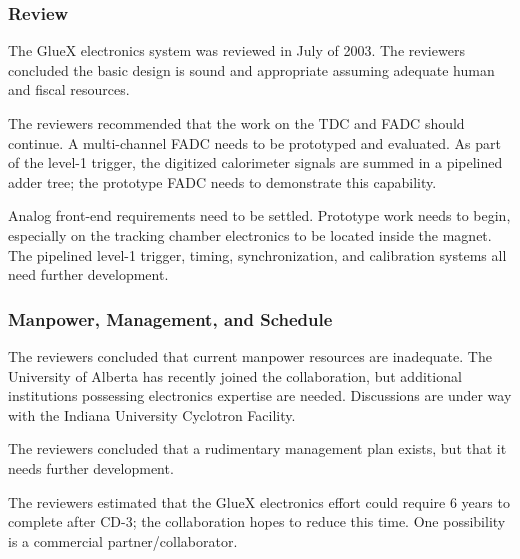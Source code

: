 \subsubsection*{Review}

The GlueX electronics system was reviewed in July of 2003.  The
reviewers concluded the basic design is sound and appropriate assuming
adequate human and fiscal resources.

The reviewers recommended that the work on the TDC and FADC should
continue.  A multi-channel FADC needs to be prototyped and evaluated.
As part of the level-1 trigger, the digitized calorimeter signals are
summed in a pipelined adder tree; the prototype FADC needs to
demonstrate this capability.

Analog front-end requirements need to be settled.  Prototype work
needs to begin, especially on the tracking chamber electronics to be
located inside the magnet.  The pipelined level-1 trigger, timing,
synchronization, and calibration systems all need further development.



\subsubsection*{Manpower, Management, and Schedule}

The reviewers concluded that current manpower resources are
inadequate.  The University of Alberta has recently joined the
collaboration, but additional institutions possessing electronics
expertise are needed.  Discussions are under way with the Indiana University
Cyclotron Facility.

The reviewers concluded that a rudimentary management plan exists, but
that it needs further development.  

The reviewers estimated that the GlueX electronics effort could
require 6 years to complete after CD-3; the collaboration hopes to
reduce this time.  One possibility is a commercial partner/collaborator.
